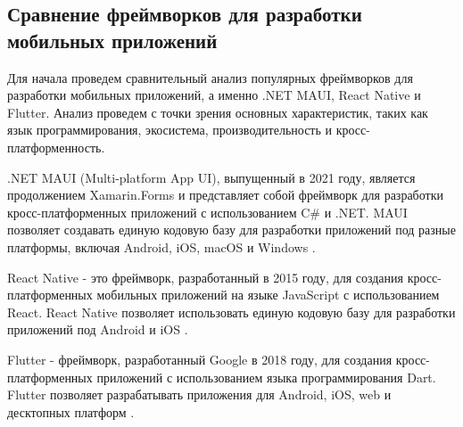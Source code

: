
\subsection{Сравнение фреймворков для разработки мобильных приложений}
Для начала проведем сравнительный анализ популярных фреймворков для разработки мобильных приложений, а именно .NET MAUI, React Native и Flutter. Анализ проведем с точки зрения основных характеристик, таких как язык программирования, экосистема, производительность и кросс-платформенность. 

.NET MAUI (Multi-platform App UI), выпущенный в 2021 году, является продолжением Xamarin.Forms и представляет собой фреймворк для разработки кросс-платформенных приложений с использованием C\# и .NET. MAUI позволяет создавать единую кодовую базу для разработки приложений под разные платформы, включая Android, iOS, macOS и Windows \cite{MAUI}. 

React Native - это фреймворк, разработанный в 2015 году, для создания кросс-платформенных мобильных приложений на языке JavaScript с использованием React. React Native позволяет использовать единую кодовую базу для разработки приложений под Android и iOS \cite{React}. 

Flutter - фреймворк, разработанный Google в 2018 году, для создания кросс-платформенных приложений с использованием языка программирования Dart. Flutter позволяет разрабатывать приложения для Android, iOS, web и десктопных платформ \cite{Flutter}. 


